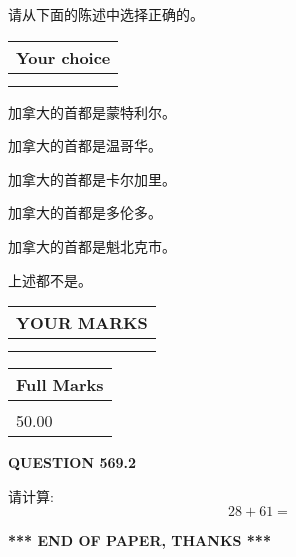 \documentclass{ctexart}
\begin{document}
  
请从下面的陈述中选择正确的。
  
  
\noindent\hspace{3.0in} \begin{tabular}{|l|}
\hline
Your choice \\
\hline
 \\ 
 \\ 
\hline
\end{tabular}
  
  
 
 
加拿大的首都是蒙特利尔。
 
 
加拿大的首都是温哥华。
 
 
加拿大的首都是卡尔加里。
 
 
加拿大的首都是多伦多。
 
 
加拿大的首都是魁北克市。
 
 
 上述都不是。
 
 
  
\vspace{0.2in}
  
\noindent\begin{tabular}{|l|}
\hline
 YOUR MARKS  \\
\hline
 \\ 
 \\ 
\hline
\end{tabular}
\hspace{0.05in} \begin{tabular}{|l|}
\hline
 Full Marks  \\
\hline
 \\ 
50.00 \\
\hline
\end{tabular}
{\textbf{\Large{QUESTION
569.2 
}}}
  
  
 
请计算:
\begin{equation}
28 +  %
61 = \nonumber
\end{equation}
 

 

 
   
   
 \vspace{0.2in}
 
   
   
   
   
\vspace{1.0in} 
{\textbf{\large{ *** END OF PAPER, THANKS *** }}} 
   
\end{document}
